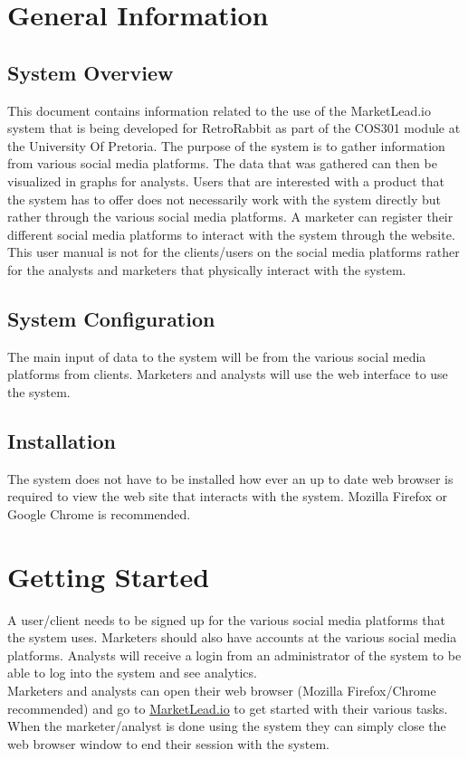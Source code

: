 \documentclass{article}
\begin{document}
	\cleardoublepage
	\tableofcontents
	\cleardoublepage
	
	\section{General Information}
		\subsection{System Overview}
			This document contains information related to the use of the MarketLead.io system that is being developed for RetroRabbit as part of the COS301 module at the University Of Pretoria. 
			The purpose of the system is to gather information from various social media platforms. The data that was gathered can then be visualized in graphs for analysts.
			Users that are interested with a product that the system has to offer does not necessarily work with the system directly but rather through the various social media platforms.
			A marketer can register their different social media platforms to interact with the system through the website.
			This user manual is not for the clients/users on the social media platforms rather for the analysts and marketers that physically interact with the system.

		\subsection{System Configuration}
			The main input of data to the system will be from the various social media platforms from clients. Marketers and analysts will use the web interface to use the system.

		\subsection{Installation}
			The system does not have to be installed how ever an up to date web browser is required to view the web site that interacts with the system. Mozilla Firefox or Google Chrome is recommended.

	\section{Getting Started}
		A user/client needs to be signed up for the various social media platforms that the system uses.
		Marketers should also have accounts at the various social media platforms.
		Analysts will receive a login from an administrator of the system to be able to log into the system and see analytics.\\
		Marketers and analysts can open their web browser (Mozilla Firefox/Chrome recommended) and go to \href{https://insuranceprofiling.herokuapp.com}{MarketLead.io} to get started with their various tasks.
		When the marketer/analyst is done using the system they can simply close the web browser window to end their session with the system.
\end{document}
